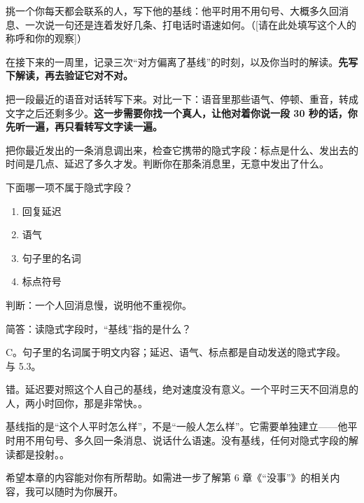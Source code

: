 \begin{exercisessec}
\item 挑一个你每天都会联系的人，写下他的基线：他平时用不用句号、大概多久回消息、一次说一句还是连着发好几条、打电话时语速如何。（[请在此处填写这个人的称呼和你的观察]）

\item 在接下来的一周里，记录三次“对方偏离了基线”的时刻，以及你当时的解读。\textbf{先写下解读，再去验证它对不对。}

\item 把一段最近的语音对话转写下来。对比一下：语音里那些语气、停顿、重音，转成文字之后还剩多少。\textbf{这一步需要你找一个真人，让他对着你说一段 30 秒的话，你先听一遍，再只看转写文字读一遍。}

\item 把你最近发出的一条消息调出来，检查它携带的隐式字段：标点是什么、发出去的时间是几点、延迟了多久才发。判断你在那条消息里，无意中发出了什么。
\end{exercisessec}

\begin{quizsec}
\item 下面哪一项不属于隐式字段？

\begin{enumerate}[label=\Alph*., leftmargin=2.2em, labelsep=0.6em,
                  itemsep=0.2em, topsep=0.3em, parsep=0.1em]
\item 回复延迟
\item 语气
\item 句子里的名词
\item 标点符号
\end{enumerate}

\item 判断：一个人回消息慢，说明他不重视你。

\item 简答：读隐式字段时，“基线”指的是什么？
\end{quizsec}

\begin{answerssec}
\item C。句子里的名词属于明文内容；延迟、语气、标点都是自动发送的隐式字段。 与 5.3。

\item 错。延迟要对照这个人自己的基线，绝对速度没有意义。一个平时三天不回消息的人，两小时回你，那是非常快。。

\item 基线指的是“这个人平时怎么样”，不是“一般人怎么样”。它需要单独建立——他平时用不用句号、多久回一条消息、说话什么语速。没有基线，任何对隐式字段的解读都是投射。。
\end{answerssec}

\hcirule

\begin{qabox}
\end{qabox}

\hcirule

希望本章的内容能对你有所帮助。如需进一步了解第 6 章《“没事”》的相关内容，我可以随时为你展开。


